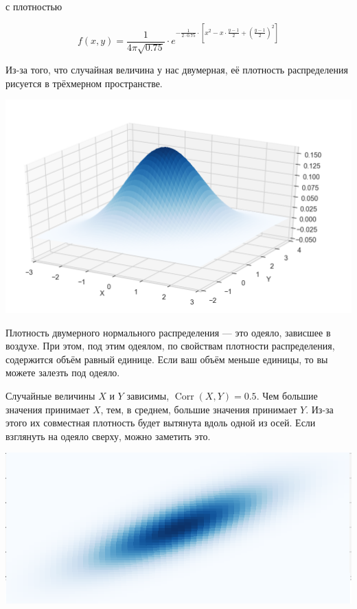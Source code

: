 \documentclass[12pt, a4paper, oneside]{extreport}
\DeclareMathOperator{\Corr}{Corr}
\theoremstyle{plain}              %
\theoremstyle{definition}         %
\begin{document}
с плотностью 

\[
f(x,y) = \frac{1}{4 \pi \sqrt{0.75}} \cdot e^{-\frac{1}{2 \cdot 0.75} \cdot \left[ x^2 - x \cdot \frac{y - 1}{2} + \left( \frac{y - 1}{2}    \right)^2   \right]}
\]

Из-за того, что случайная величина у нас двумерная, её плотность распределения рисуется в трёхмерном пространстве. 

\begin{center}
\includegraphics[scale=0.25]{two_normal_1.png}
\end{center}

Плотность двумерного нормального распределения --- это одеяло, зависшее в воздухе. При этом, под этим одеялом, по свойствам плотности распределения,  содержится объём равный единице. Если ваш объём меньше единицы, то вы можете залезть под одеяло. 

Случайные величины $X$ и $Y$ зависимы, $\Corr(X,Y) = 0.5$. Чем большие значения принимает $X$, тем, в среднем, большие значения принимает $Y$.   Из-за этого их совместная плотность будет вытянута вдоль одной из осей. Если взглянуть на одеяло сверху, можно заметить это. 


\begin{center}
\includegraphics[scale=0.25]{two_normal_2.png}
\end{center}
\end{document}
